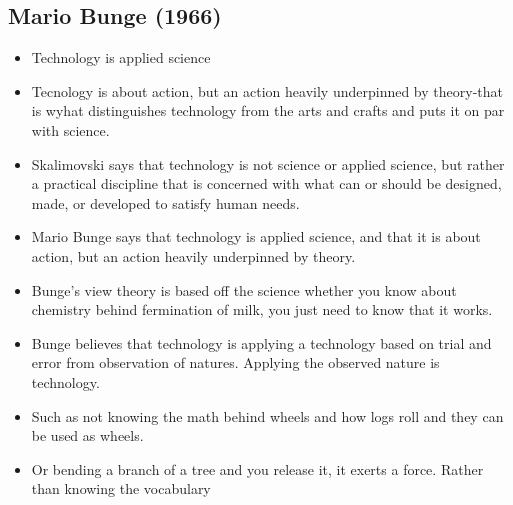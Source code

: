 \documentclass{article}
\begin{document}
\subsection{Mario Bunge (1966)}
\begin{itemize}
  \item Technology is applied science
  \item Tecnology is about action, but an action heavily
    underpinned by theory-that
    is wyhat distinguishes technology from the arts and crafts and puts
    it on par with science.
  \item Skalimovski says that technology is not science or applied science,
    but rather a practical discipline that is concerned with what can or should be
    designed, made, or developed to satisfy human needs.
  \item Mario Bunge says that technology is applied science,
    and that it is about action, but an action heavily underpinned by theory.
  \item Bunge's view theory is based off the science whether
    you know about chemistry behind fermination of milk,
    you just need to know that it works.
  \item Bunge believes that technology is applying a technology
    based on trial and error from observation of natures.
    Applying the observed nature is technology.
  \item Such as not knowing the math behind wheels and
    how logs roll and they can be used as wheels.
  \item Or bending a branch of a tree and you release it,
    it exerts a force. Rather than knowing the vocabulary

\end{itemize}
\end{document}
